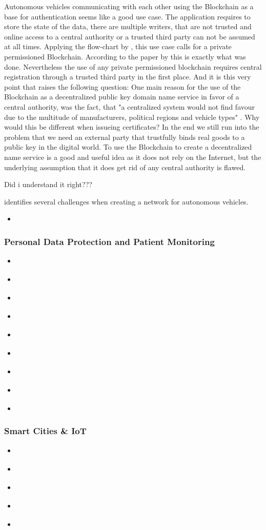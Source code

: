 Autonomous vehicles communicating with each other using the Blockchain as a base for authentication seems like a good use case. The application requires to store the state of the data, there are multiple writers, that are not trusted and online access to a central authority or a trusted third party can not be assumed at all times. Applying the flow-chart by \citeauthor{Wust2017}, this use case calls for a private permissioned Blockchain. 
According to the paper by \citeauthor{Rowan2017} this is exactly what was done. 
Nevertheless the use of any private permissioned blockchain requires central registration through a trusted third party in the first place. And it is this very point that raises the following question: One main reason for the use of the Blockchain as a decentralized public key domain name service in favor of a central authority, was the fact, that "a centralized system would not find favour due to the multitude of manufacturers, political regions and vehicle types" \cite{Rowan2017}. Why would this be different when issueing certificates?
In the end we still run into the problem that we need an external party that trustfully binds real goods to a public key in the digital world. 
To use the Blockchain to create a decentralized name service is a good and useful idea as it does not rely on the Internet, but the underlying assumption that it does get rid of any central authority is flawed.

Did i understand it right???

\citeauthor{Sharma2017} identifies several challenges when creating a network for autonomous vehicles.



\begin{itemize}
	\item \cite{Sharma2017}
\end{itemize}
\subsubsection{Personal Data Protection and Patient Monitoring}
\begin{itemize}
	\item \cite{Zyskind2015}
	\item \cite{Yue2016}
	\item \cite{Azaria2016}
	\item \cite{Fotiou2016}
	\item \cite{Zhang2017}
	\item \cite{Zhang2018}
	\item \cite{Esposito2018}
	\item \cite{Ekblaw2016}
	\item \cite{Cao2019}
\end{itemize}
\subsubsection{Smart Cities \& IoT}
\begin{itemize}
	\item \cite{Biswas2016}
	\item \cite{Mylrea2017}
	\item \cite{Liang2018}
	\item \cite{Dorri2017a}
	\item \cite{Shafagh2017}
\end{itemize}

